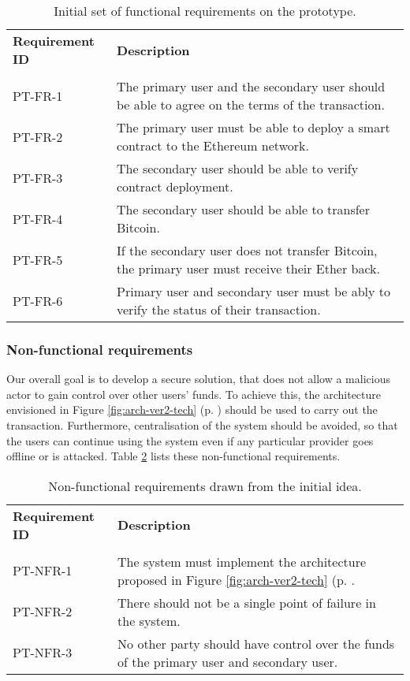 \begin{table}[ht]
    \centering
    \begin{tabularx}{\textwidth}{|l X|}
    \hline
    \textbf{Requirement ID}& \textbf{Description}\\
    &\\
    PT-FR-1 & The primary user and the secondary user should be able to agree on the terms of the transaction.\\
    PT-FR-2 & The primary user must be able to deploy a smart contract to the Ethereum network.\\
    PT-FR-3 & The secondary user should be able to verify contract deployment.\\
    PT-FR-4 & The secondary user should be able to transfer Bitcoin.\\
    PT-FR-5 & If the secondary user does not transfer Bitcoin, the primary user must receive their Ether back.\\
    PT-FR-6 & Primary user and secondary user must be ably to verify the status of their transaction.\\
    \hline
    \end{tabularx}
    \caption{Initial set of functional requirements on the prototype.}
    \label{tab:pt-func-reqs}
    \end{table}
% 
\subsubsection{Non-functional requirements}
Our overall goal is to develop a secure solution, that does not allow a malicious actor to gain control over other users' funds. To achieve this, the architecture envisioned in Figure \ref{fig:arch-ver2-tech} (p. \pageref{fig:arch-ver2-tech}) should be used to carry out the transaction. Furthermore, centralisation of the system should be avoided, so that the users can continue using the system even if any particular provider goes offline or is attacked. Table \ref{tab:pt-nonfunc-reqs} lists these non-functional requirements.

\begin{table}[ht]
    \centering
    \begin{tabularx}{\textwidth}{|l X|}
    \hline
    \textbf{Requirement ID}&\textbf{Description}\\
    &\\
    PT-NFR-1&The system must implement the architecture proposed in Figure \ref{fig:arch-ver2-tech} (p. \pageref{fig:arch-ver2-tech}.\\
    PT-NFR-2&There should not be a single point of failure in the system.\\
    PT-NFR-3&No other party should have control over the funds of the primary user and secondary user.\\
    \hline
    \end{tabularx}
    
    \caption{Non-functional requirements drawn from the initial idea.}
    \label{tab:pt-nonfunc-reqs}
\end{table}

